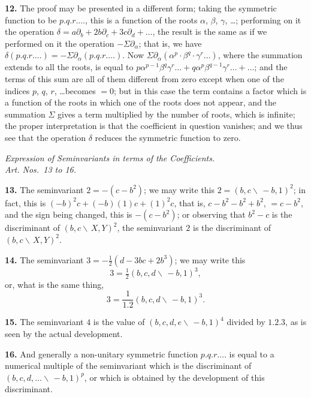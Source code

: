 \documentclass[11pt,a4paper]{book}
\begin{document}
\noindent\textbf{12.} The proof may be presented in a different form; taking the symmetric function to be $p.q.r.\dots$, this is a function of the roots $\alpha$, $\beta$, $\gamma$, \dots; performing on it the operation $\delta = a\partial_b + 2b\partial_c + 3c\partial_d + \dots$, the result is the same as if we performed on it the operation $-\Sigma\partial_\alpha$; that is, we have $\delta(p.q.r.\dots) = -\Sigma\partial_\alpha(p.q.r.\dots)$. Now $\Sigma\partial_\alpha(\alpha^p \cdot \beta^q \cdot \gamma^r \dots)$, where the summation extends to all the roots, is equal to $p\alpha^{p-1}\beta^q\gamma^r\dots + q\alpha^p\beta^{q-1}\gamma^r\dots + \dots$; and the terms of this sum are all of them different from zero except when one of the indices $p$, $q$, $r$, \dots becomes $= 0$; but in this case the term contains a factor which is a function of the roots in which one of the roots does not appear, and the summation $\Sigma$ gives a term multiplied by the number of roots, which is infinite; the proper interpretation is that the coefficient in question vanishes; and we thus see that the operation $\delta$ reduces the symmetric function to zero.

\begin{center}
\textit{Expression of Seminvariants in terms of the Coefficients.}\\
\textit{Art. Nos.~13 to 16.}
\end{center}

\noindent\textbf{13.} The seminvariant $2 = -(c - b^2)$; we may write this $2 = (b, c \!\!\!\backslash\, -b, 1)^2$; in fact, this is $(-b)^2 c + (-b)(1)c + (1)^2 c$, that is, $c - b^2 - b^2 + b^2$, $= c - b^2$, and the sign being changed, this is $-(c - b^2)$; or observing that $b^2 - c$ is the discriminant of $(b, c \!\!\!\backslash\, X, Y)^2$, the seminvariant $2$ is the discriminant of $(b, c \!\!\!\backslash\, X, Y)^2$.

\noindent\textbf{14.} The seminvariant $3 = -\tfrac{1}{2}(d - 3bc + 2b^3)$; we may write this
\[
3 = \tfrac{1}{2}(b, c, d \!\!\!\backslash\, -b, 1)^3,
\]
or, what is the same thing,
\[
3 = \frac{1}{1.2}(b, c, d \!\!\!\backslash\, -b, 1)^3.
\]

\noindent\textbf{15.} The seminvariant $4$ is the value of $(b, c, d, e \!\!\!\backslash\, -b, 1)^4$ divided by $1.2.3$, as is seen by the actual development.

\noindent\textbf{16.} And generally a non-unitary symmetric function $p.q.r.\dots$ is equal to a numerical multiple of the seminvariant which is the discriminant of $(b, c, d, \dots \!\!\!\backslash\, -b, 1)^p$, or which is obtained by the development of this discriminant.
\end{document}
